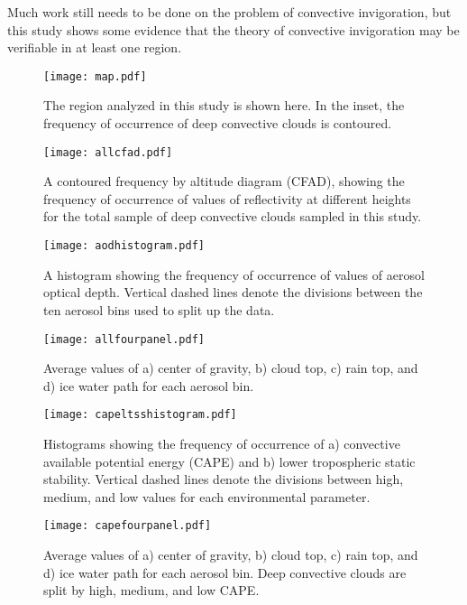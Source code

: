 Much work still needs to be done on the problem of convective invigoration, but this study shows some evidence that the theory of convective invigoration may be verifiable in at least one region.


\begin{figure}[t]
 \noindent\texttt{[image: map.pdf]}
 \caption{The region analyzed in this study is shown here.  In the inset, the frequency of occurrence of deep convective clouds is contoured.}\label{fig1}
 \end{figure}
 
\begin{figure}[t]
 \noindent\texttt{[image: allcfad.pdf]}
 \caption{A contoured frequency by altitude diagram (CFAD), showing the frequency of occurrence of values of reflectivity at different heights for the total sample of deep convective clouds sampled in this study.}\label{fig2}
 \end{figure} 
 
 \begin{figure}[t]
 \noindent\texttt{[image: aodhistogram.pdf]}
 \caption{A histogram showing the frequency of occurrence of values of aerosol optical depth.  Vertical dashed lines denote the divisions between the ten aerosol bins used to split up the data.}\label{fig3}
 \end{figure}
 
 \begin{figure}[t]
 \noindent\texttt{[image: allfourpanel.pdf]}
 \caption{Average values of a) center of gravity, b) cloud top, c) rain top, and d) ice water path for each aerosol bin.}\label{fig4}
 \end{figure}
 
 \begin{figure}[t]
 \noindent\texttt{[image: capeltsshistogram.pdf]}
 \caption{Histograms showing the frequency of occurrence of a) convective available potential energy (CAPE) and b) lower tropospheric static stability.  Vertical dashed lines denote the divisions between high, medium, and low values for each environmental parameter.}\label{fig5}
 \end{figure}
 
 \begin{figure}[t]
 \noindent\texttt{[image: capefourpanel.pdf]}
 \caption{Average values of a) center of gravity, b) cloud top, c) rain top, and d) ice water path for each aerosol bin.  Deep convective clouds are split by high, medium, and low CAPE.}\label{fig6}
 \end{figure}
 
